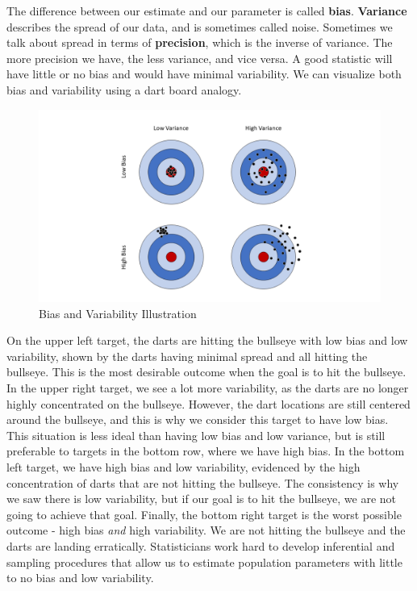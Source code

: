 \documentclass[
]{book}
\theoremstyle{definition}
\theoremstyle{definition}
\theoremstyle{definition}
\theoremstyle{remark}
\begin{document}
The difference between our estimate and our parameter is called \textbf{bias}. \textbf{Variance} describes the spread of our data, and is sometimes called noise. Sometimes we talk about spread in terms of \textbf{precision}, which is the inverse of variance. The more precision we have, the less variance, and vice versa. A good statistic will have little or no bias and would have minimal variability. We can visualize both bias and variability using a dart board analogy.

\begin{figure}[H]

{\centering \includegraphics[width=27.78in]{./images/biasVariabilityTargets2} 

}

\caption{Bias and Variability Illustration}\label{fig:image-ref-for-in-text2}
\end{figure}

On the upper left target, the darts are hitting the bullseye with low bias and low variability, shown by the darts having minimal spread and all hitting the bullseye. This is the most desirable outcome when the goal is to hit the bullseye. In the upper right target, we see a lot more variability, as the darts are no longer highly concentrated on the bullseye. However, the dart locations are still centered around the bullseye, and this is why we consider this target to have low bias. This situation is less ideal than having low bias and low variance, but is still preferable to targets in the bottom row, where we have high bias. In the bottom left target, we have high bias and low variability, evidenced by the high concentration of darts that are not hitting the bullseye. The consistency is why we saw there is low variability, but if our goal is to hit the bullseye, we are not going to achieve that goal. Finally, the bottom right target is the worst possible outcome - high bias \emph{and} high variability. We are not hitting the bullseye and the darts are landing erratically. Statisticians work hard to develop inferential and sampling procedures that allow us to estimate population parameters with little to no bias and low variability.
\end{document}
